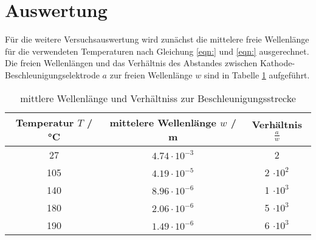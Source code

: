 \section{Auswertung}
\label{sec:Auswertung}
Für die weitere Versuchsauswertung wird zunächst die mittelere freie Wellenlänge für die verwendeten Temperaturen nach Gleichung \ref{eqn:} und \ref{eqn:} ausgerechnet. Die freien Wellenlängen und das Verhältnis des Abstandes zwischen Kathode-Beschleunigungselektrode $a$ zur freien Wellenlänge $w$ sind in Tabelle \ref{tab:mitWel} aufgeführt.
\begin{table}
  \centering
  \begin{tabular}{c c c}
    \toprule
    	Temperatur $T$ / °C & mittelere Wellenlänge $w$ / m & Verhältnis $\frac{a}{w}$ \\
    \midrule
    	27  & $4.74 \cdot 10^{-3}$	& 2			\\
      	105 & $4.19 \cdot 10^{-5}$	& 2 $\cdot 10^2$	\\
	140 & $8.96 \cdot 10^{-6}$	& 1 $\cdot 10^3$	\\
	180 & $2.06 \cdot 10^{-6}$	& 5 $\cdot 10^3$	\\
	190 & $1.49 \cdot 10^{-6}$	& 6 $\cdot 10^3$	\\
	\bottomrule
  \end{tabular}
  \caption{mittlere Wellenlänge und Verhältniss zur Beschleunigungsstrecke}
  \label{tab:mitWel}
\end{table}

